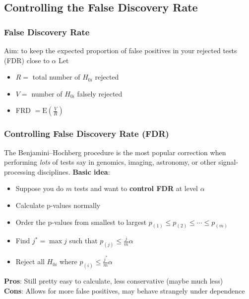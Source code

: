 \documentclass[a4paper]{article}
\begin{document}
\subsection{Controlling the False Discovery Rate}
\subsubsection{False Discovery Rate}
Aim: to keep the expected proportion of false positives in your rejected tests (FDR) close to \( \alpha \)
Let
\begin{itemize}
	\item \( R = \) total number of \( H_{0i} \) rejected
	\item \( V = \) number of \( H_{0i} \) falsely rejected
	\item FRD \( = \mathrm{E}\left( \frac{V}{R} \right) \) 
\end{itemize}
\subsubsection{Controlling False Discovery Rate (FDR)}
The \textcolor{myred}{Benjamini--Hochberg} procedure is the most popular correction when performing \textit{lots} of tests say in genomics, imaging, astronomy, or other signal-processing disciplines.
\textbf{Basic idea}:
	\begin{itemize}
		\item Suppose you do \( m \) tests and want to \textbf{control FDR} at level \( \alpha \)
		\item Calculate p-values normally
		\item Order the p-values from smallest to largest \( p_{(1)} \leq p_{(2)} \leq \dotsb \leq p_{(m)} \)
		\item Find \( j^\ast = \max j \) such that \( p_{(j)} \leq \frac{j}{m} \alpha \)
		\item Reject all \( H_{0i} \) where \( p_{(i)} \leq \frac{j^\ast}{m} \alpha \)
	\end{itemize}
\textbf{Pros}: Still pretty easy to calculate, less conservative (maybe much less)\\
\textbf{Cons}: Allows for more false positives, may behave strangely under dependence
\end{document}

